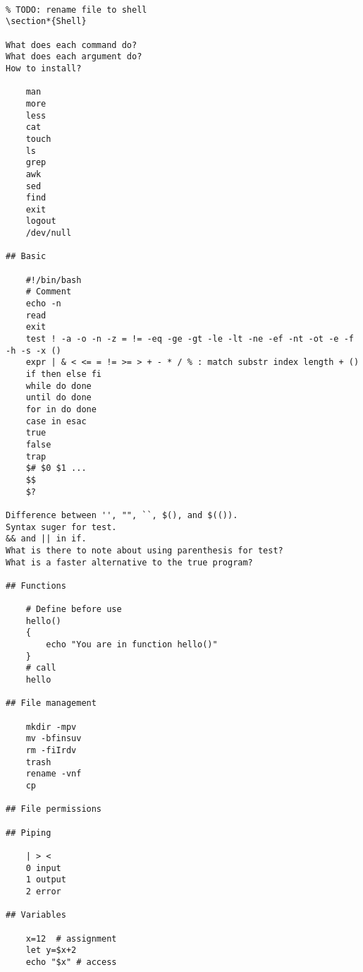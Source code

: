 \documentclass[twocolumn]{article}
\begin{document}
\begin{lstlisting}

% TODO: rename file to shell
\section*{Shell}

What does each command do?
What does each argument do?
How to install?

    man
    more
    less
    cat
    touch
    ls
    grep
    awk
    sed
    find
    exit
    logout
    /dev/null

## Basic

    #!/bin/bash
    # Comment
    echo -n
    read
    exit
    test ! -a -o -n -z = != -eq -ge -gt -le -lt -ne -ef -nt -ot -e -f -h -s -x ()
    expr | & < <= = != >= > + - * / % : match substr index length + ()
    if then else fi
    while do done
    until do done
    for in do done
    case in esac
    true
    false
    trap
    $# $0 $1 ...
    $$
    $?

Difference between '', "", ``, $(), and $(()).
Syntax suger for test.
&& and || in if.
What is there to note about using parenthesis for test?
What is a faster alternative to the true program?

## Functions

    # Define before use
    hello()
    {
        echo "You are in function hello()"
    }
    # call
    hello

## File management

    mkdir -mpv
    mv -bfinsuv
    rm -fiIrdv
    trash
    rename -vnf
    cp

## File permissions

## Piping

    | > <
    0 input
    1 output
    2 error

## Variables

    x=12  # assignment
    let y=$x+2
    echo "$x" # access
\end{lstlisting}
\end{document}
